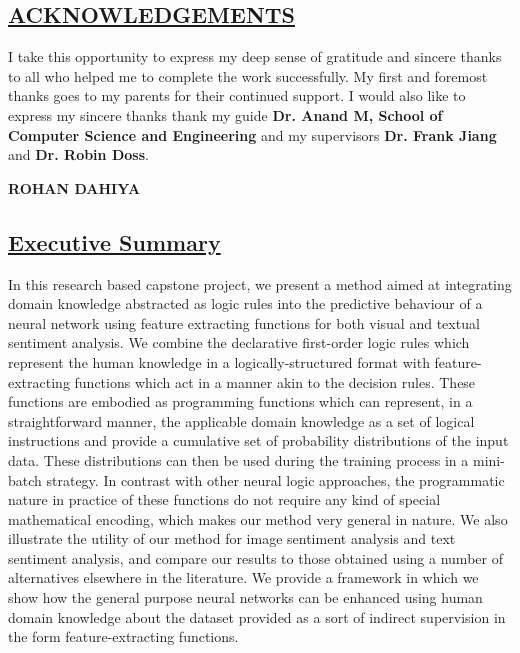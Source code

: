 \documentclass[12pt,a4paper]{article}
\begin{document}
\newpage
\begin{center}
\section*{\textbf{\underline{ACKNOWLEDGEMENTS}}}
\label{sec:ack}
\end{center}
\vspace{1 cm}
I take this opportunity to express my deep sense of gratitude and sincere thanks to all who helped me to complete the work successfully. My first and foremost thanks goes to my parents for their continued support. I would also like to express my sincere thanks thank my guide \textbf{Dr. Anand M, School of Computer Science and Engineering} and my supervisors \textbf{Dr. Frank Jiang} and \textbf{Dr. Robin Doss}.\\




\vspace{1 cm}
\begin{flushright}
\textbf{ROHAN DAHIYA}
\end{flushright}

\newpage
\begin{center}
\section*{\textbf{\underline{Executive Summary}}}
\label{sec:summary}
\end{center}
\vspace{1 cm}
In this research based capstone project, we present a method aimed at integrating domain knowledge abstracted as logic rules into the predictive behaviour of a neural network using feature extracting functions for both visual and textual sentiment analysis. We combine the declarative first-order logic rules which represent the human knowledge in a logically-structured format with feature-extracting functions which act in a manner akin to the decision rules. These functions are embodied as programming functions which can represent, in a straightforward manner, the applicable domain knowledge as a set of logical instructions and provide a cumulative set of probability distributions of the input data. These distributions can then be used during the training process in a mini-batch strategy. In contrast with other neural logic approaches, the programmatic nature in practice of these functions do not require any kind of special mathematical encoding, which makes our method very general in nature. We also illustrate the utility of our method for image sentiment analysis and text sentiment analysis, and compare our results to those obtained using a number of alternatives elsewhere in the literature. We provide a framework in which we show how the general purpose neural networks can be enhanced using human domain knowledge about the dataset provided as a sort of indirect supervision in the form feature-extracting functions.
\end{document}
